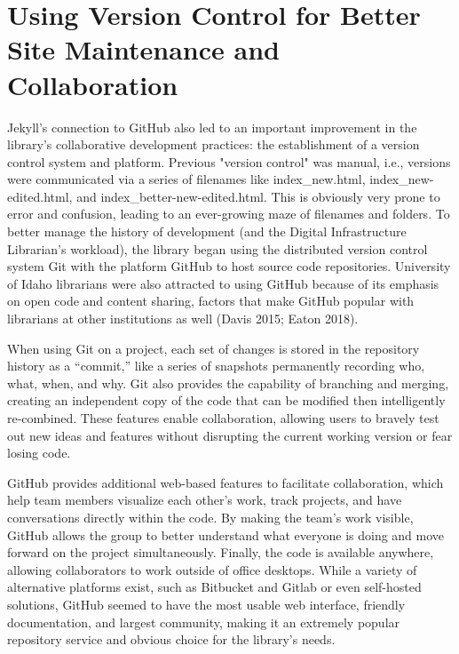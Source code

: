 \documentclass{book}
\begin{document}
\hypertarget{using-version-control-for-better-site-maintenance-and-collaboration}{%
\section{Using Version Control for Better Site Maintenance and
Collaboration}\label{using-version-control-for-better-site-maintenance-and-collaboration}}

Jekyll's connection to GitHub also led to an important improvement in the
library's collaborative development practices: the establishment of a version
control system and platform. Previous "version control" was manual, i.e.,
versions were communicated via a series of filenames like index\_new.html,
index\_new-edited.html, and index\_better-new-edited.html. This is obviously
very prone to error and confusion, leading to an ever-growing maze of
filenames and folders. To better manage the history of development (and the
Digital Infrastructure Librarian's workload), the library began using the
distributed version control system Git with the platform GitHub to host source
code repositories. University of Idaho librarians were also attracted to using
GitHub because of its emphasis on open code and content sharing, factors that
make GitHub popular with librarians at other institutions as well (Davis 2015;
Eaton 2018).

When using Git on a project, each set of changes is stored in the repository
history as a ``commit,'' like a series of snapshots permanently recording who,
what, when, and why. Git also provides the capability of branching and
merging, creating an independent copy of the code that can be modified then
intelligently re-combined. These features enable collaboration, allowing users
to bravely test out new ideas and features without disrupting the current
working version or fear losing code.

GitHub provides additional web-based features to facilitate collaboration,
which help team members visualize each other's work, track projects, and have
conversations directly within the code. By making the team's work visible,
GitHub allows the group to better understand what everyone is doing and move
forward on the project simultaneously. Finally, the code is available
anywhere, allowing collaborators to work outside of office desktops. While a
variety of alternative platforms exist, such as Bitbucket and Gitlab or even
self-hosted solutions, GitHub seemed to have the most usable web interface,
friendly documentation, and largest community, making it an extremely popular
repository service and obvious choice for the library's needs.
\end{document}
